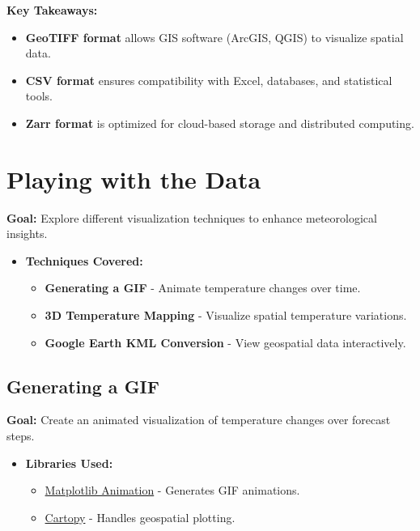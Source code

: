 \documentclass[a4paper,10pt]{article}
\begin{document}
\textbf{Key Takeaways:}
\begin{itemize}
    \item \textbf{GeoTIFF format} allows GIS software (ArcGIS, QGIS) to visualize spatial data.
    \item \textbf{CSV format} ensures compatibility with Excel, databases, and statistical tools.
    \item \textbf{Zarr format} is optimized for cloud-based storage and distributed computing.
\end{itemize}

\section{Playing with the Data}
\textbf{Goal:} Explore different visualization techniques to enhance meteorological insights.

\begin{itemize}
    \item \textbf{Techniques Covered:}
    \begin{itemize}
        \item \textbf{Generating a GIF} - Animate temperature changes over time.
        \item \textbf{3D Temperature Mapping} - Visualize spatial temperature variations.
        \item \textbf{Google Earth KML Conversion} - View geospatial data interactively.
    \end{itemize}
\end{itemize}

\subsection{Generating a GIF}
\textbf{Goal:} Create an animated visualization of temperature changes over forecast steps.

\begin{itemize}
    \item \textbf{Libraries Used:}
    \begin{itemize}
        \item \href{https://matplotlib.org/stable/api/animation_api.html}{Matplotlib Animation} - Generates GIF animations.
        \item \href{https://scitools.org.uk/cartopy/docs/latest/}{Cartopy} - Handles geospatial plotting.
    \end{itemize}
\end{itemize}
\end{document}
